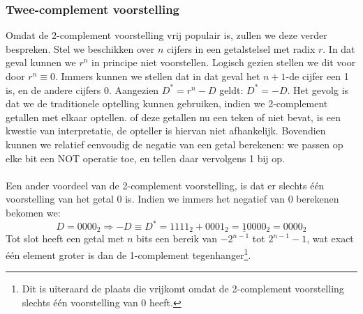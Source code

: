 \subsubsection{Twee-complement voorstelling}
Omdat de 2-complement voorstelling vrij populair is, zullen we deze verder bespreken. Stel we beschikken over $n$ cijfers in een getalstelsel met radix $r$. In dat geval kunnen we $r^n$ in principe niet voorstellen. Logisch gezien stellen we dit voor door $r^n\equiv 0$. Immers kunnen we stellen dat in dat geval het $n+1$-de cijfer een 1 is, en de andere cijfers 0. Aangezien $D^*=r^n-D$ geldt: $D^*=-D$. Het gevolg is dat we de traditionele optelling kunnen gebruiken, indien we 2-complement getallen met elkaar optellen. of deze getallen nu een teken of niet bevat, is een kwestie van interpretatie, de opteller is hiervan niet afhankelijk. Bovendien kunnen we relatief eenvoudig de negatie van een getal berekenen: we passen op elke bit een NOT operatie toe, en tellen daar vervolgens 1 bij op.
\paragraph{}
Een ander voordeel van de 2-complement voorstelling, is dat er slechts \'e\'en voorstelling van het getal 0 is. Indien we immers het negatief van 0 berekenen bekomen we:
\begin{equation}
D=0000_2\Rightarrow -D\equiv D^*=1111_2+0001_2=\underline{1}0000_2=0000_2
\end{equation}
Tot slot heeft een getal met $n$ bits een bereik van $-2^{n-1}$ tot $2^{n-1}-1$, wat exact \'e\'en element groter is dan de 1-complement tegenhanger\footnote{Dit is uiteraard de plaats die vrijkomt omdat de 2-complement voorstelling slechts \'e\'en voorstelling van 0 heeft.}.
